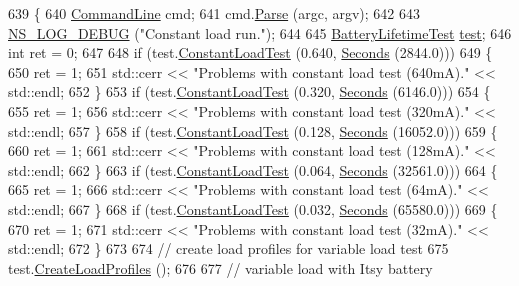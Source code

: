 \begin{DoxyCode}
639 \{
640   \hyperlink{classns3_1_1CommandLine}{CommandLine} cmd;
641   cmd.\hyperlink{classns3_1_1CommandLine_a5c10b85b3207e5ecb48d907966923156}{Parse} (argc, argv);
642   
643   \hyperlink{group__logging_ga413f1886406d49f59a6a0a89b77b4d0a}{NS\_LOG\_DEBUG} (\textcolor{stringliteral}{"Constant load run."});
644 
645   \hyperlink{classBatteryLifetimeTest}{BatteryLifetimeTest} \hyperlink{main-test-sync_8cc_a708a4c1a4d0c4acc4c447310dd4db27f}{test};
646   \textcolor{keywordtype}{int} ret = 0;
647 
648   \textcolor{keywordflow}{if} (test.\hyperlink{classBatteryLifetimeTest_a5cfb6c588872035454feb525491b1d52}{ConstantLoadTest} (0.640, \hyperlink{group__timecivil_ga33c34b816f8ff6628e33d5c8e9713b9e}{Seconds} (2844.0)))
649     \{
650       ret = 1;
651       std::cerr << \textcolor{stringliteral}{"Problems with constant load test (640mA)."} << std::endl;
652     \}
653   \textcolor{keywordflow}{if} (test.\hyperlink{classBatteryLifetimeTest_a5cfb6c588872035454feb525491b1d52}{ConstantLoadTest} (0.320, \hyperlink{group__timecivil_ga33c34b816f8ff6628e33d5c8e9713b9e}{Seconds} (6146.0)))
654     \{
655       ret = 1;
656       std::cerr << \textcolor{stringliteral}{"Problems with constant load test (320mA)."} << std::endl;
657     \}
658   \textcolor{keywordflow}{if} (test.\hyperlink{classBatteryLifetimeTest_a5cfb6c588872035454feb525491b1d52}{ConstantLoadTest} (0.128, \hyperlink{group__timecivil_ga33c34b816f8ff6628e33d5c8e9713b9e}{Seconds} (16052.0)))
659     \{
660       ret = 1;
661       std::cerr << \textcolor{stringliteral}{"Problems with constant load test (128mA)."} << std::endl;
662     \}
663   \textcolor{keywordflow}{if} (test.\hyperlink{classBatteryLifetimeTest_a5cfb6c588872035454feb525491b1d52}{ConstantLoadTest} (0.064, \hyperlink{group__timecivil_ga33c34b816f8ff6628e33d5c8e9713b9e}{Seconds} (32561.0)))
664     \{
665       ret = 1;
666       std::cerr << \textcolor{stringliteral}{"Problems with constant load test (64mA)."} << std::endl;
667     \}
668   \textcolor{keywordflow}{if} (test.\hyperlink{classBatteryLifetimeTest_a5cfb6c588872035454feb525491b1d52}{ConstantLoadTest} (0.032, \hyperlink{group__timecivil_ga33c34b816f8ff6628e33d5c8e9713b9e}{Seconds} (65580.0)))
669     \{
670       ret = 1;
671       std::cerr << \textcolor{stringliteral}{"Problems with constant load test (32mA)."} << std::endl;
672     \}
673 
674   \textcolor{comment}{// create load profiles for variable load test}
675   test.\hyperlink{classBatteryLifetimeTest_a5987a9b8efd2a8e594f52d2b8ba6af63}{CreateLoadProfiles} ();
676 
677   \textcolor{comment}{// variable load with Itsy battery}

\end{DoxyCode}
